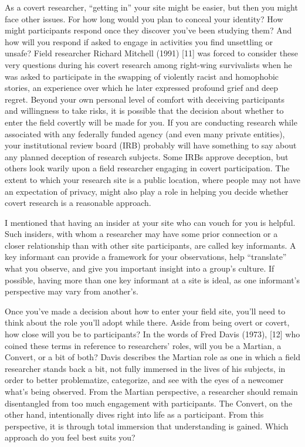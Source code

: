 As a covert researcher, “getting in” your site might be easier, but then you might face other issues. For how long would you plan to conceal your identity? How might participants respond once they discover you’ve been studying them? And how will you respond if asked to engage in activities you find unsettling or unsafe? Field researcher Richard Mitchell (1991) [11] was forced to consider these very questions during his covert research among right-wing survivalists when he was asked to participate in the swapping of violently racist and homophobic stories, an experience over which he later expressed profound grief and deep regret. Beyond your own personal level of comfort with deceiving participants and willingness to take risks, it is possible that the decision about whether to enter the field covertly will be made for you. If you are conducting research while associated with any federally funded agency (and even many private entities), your institutional review board (IRB) probably will have something to say about any planned deception of research subjects. Some IRBs approve deception, but others look warily upon a field researcher engaging in covert participation. The extent to which your research site is a public location, where people may not have an expectation of privacy, might also play a role in helping you decide whether covert research is a reasonable approach.

I mentioned that having an insider at your site who can vouch for you is helpful. Such insiders, with whom a researcher may have some prior connection or a closer relationship than with other site participants, are called key informants. A key informant can provide a framework for your observations, help “translate” what you observe, and give you important insight into a group’s culture. If possible, having more than one key informant at a site is ideal, as one informant’s perspective may vary from another’s.

Once you’ve made a decision about how to enter your field site, you’ll need to think about the role you’ll adopt while there. Aside from being overt or covert, how close will you be to participants? In the words of Fred Davis (1973), [12] who coined these terms in reference to researchers’ roles, will you be a Martian, a Convert, or a bit of both? Davis describes the Martian role as one in which a field researcher stands back a bit, not fully immersed in the lives of his subjects, in order to better problematize, categorize, and see with the eyes of a newcomer what’s being observed. From the Martian perspective, a researcher should remain disentangled from too much engagement with participants. The Convert, on the other hand, intentionally dives right into life as a participant. From this perspective, it is through total immersion that understanding is gained. Which approach do you feel best suits you?

